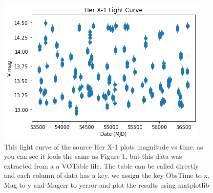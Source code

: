 \documentclass{article}
\begin{document}
\begin{figure}[ht!]
\centering
\includegraphics[scale=.7]{lc2.png}
\caption{This light curve of the source Her X-1 plots magnitude vs time. as you can see it lools the same as Figure 1, but this data was extracted from a a VOTable file. The table can be called directly and each column of data has a key.  we assign the key ObsTime to x, Mag to y and Magerr to yerror and plot the results using matplotlib}
\label{fig: VOTable Light Curve}
\end{figure}
\end{document}
